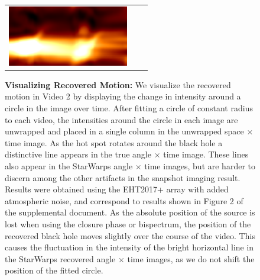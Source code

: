 \begin{figure}[tb]
\begin{center}
\begin{tabular}{   c | c  c   }
				\includegraphics[height=.2\linewidth]{figures/hotspotcircleinterp/best.png} 
				\\
		\end{tabular}
		\caption{{\bf Visualizing Recovered Motion:} We visualize the recovered motion in Video 2 by displaying the change in intensity around a circle in the image over time. After fitting a circle of constant radius to each video,  the intensities around the circle in each image are unwrapped and placed in a single column in the unwrapped space $\times$ time image. As the hot spot rotates around the black hole a distinctive line appears in the true angle $\times$ time image. These lines also appear in the StarWarps angle $\times$ time images, but are harder to discern among the other artifacts in the snapshot imaging result. Results were obtained using the EHT2017+ array with added atmospheric noise, and correspond to results shown in Figure 2 of the supplemental document. As the absolute position of the source is lost when using the closure phase or bispectrum, the position of the recovered black hole moves slightly over the course of the video. This causes the fluctuation in the intensity of the bright horizontal line in the StarWarps recovered angle $\times$ time images, as we do not shift the position of the fitted circle.  }
		\label{fig:motion}
	\end{center}
	\vspace{-.35in}
\end{figure}
